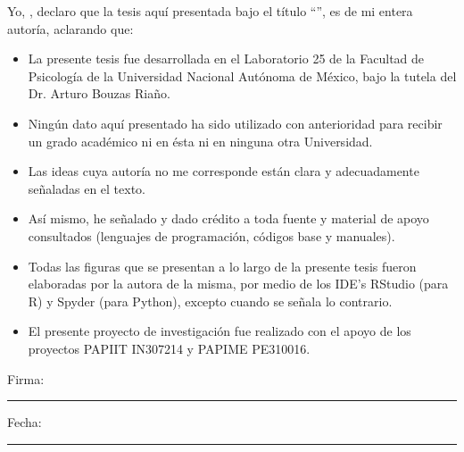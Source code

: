 \documentclass[
12pt, %
spanish, %
onehalfspacing, %
headsepline, %
]{MastersDoctoralThesis} %
\begin{document}
\begin{declaration}
\addchaptertocentry{\authorshipname} %
\noindent Yo, \authorname, declaro que la tesis aquí presentada bajo el título \enquote{\ttitle}, es de mi entera autoría, aclarando que:\\

\begin{itemize} 
\item La presente tesis fue desarrollada en el Laboratorio 25 de la Facultad de Psicología de la Universidad Nacional Autónoma de México, bajo la tutela del Dr. Arturo Bouzas Riaño. 
\item Ningún dato aquí presentado ha sido utilizado con anterioridad para recibir un grado académico ni en ésta ni en ninguna otra Universidad. 
\item Las ideas cuya autoría no me corresponde están clara y adecuadamente señaladas en el texto. 
\item Así mismo, he señalado y dado crédito a toda fuente y material de apoyo consultados (lenguajes de programación, códigos base y manuales).
\item Todas las figuras que se presentan a lo largo de la presente tesis fueron elaboradas por la autora de la misma, por medio de los IDE's RStudio (para R) y Spyder (para Python), excepto cuando se señala lo contrario.
\item El presente proyecto de investigación fue realizado con el apoyo de los proyectos PAPIIT IN307214 y PAPIME PE310016.\\
\end{itemize}
 
\noindent Firma:\\
\rule[0.5em]{25em}{0.5pt} %
 
\noindent Fecha:\\
\rule[0.5em]{25em}{0.5pt} %
\end{declaration}

\cleardoublepage

\end{document}
